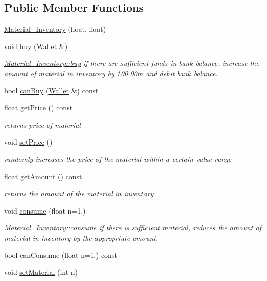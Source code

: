 \subsection*{Public Member Functions}
\begin{DoxyCompactItemize}
\item 
\mbox{\hyperlink{classMaterial__Inventory_a996e5441abe78653a8cb386a499a4063}{Material\+\_\+\+Inventory}} (float, float)
\item 
void \mbox{\hyperlink{classMaterial__Inventory_a5be24d53377c58ea2391e0f872d199d8}{buy}} (\mbox{\hyperlink{classWallet}{Wallet}} \&)
\begin{DoxyCompactList}\small\item\em \mbox{\hyperlink{classMaterial__Inventory_a5be24d53377c58ea2391e0f872d199d8}{Material\+\_\+\+Inventory\+::buy}} if there are sufficient funds in bank balance, increase the amount of material in inventory by 100.\+00m and debit bank balance. \end{DoxyCompactList}\item 
bool \mbox{\hyperlink{classMaterial__Inventory_abb1d889d0af7b79da3b5100a409a5140}{can\+Buy}} (\mbox{\hyperlink{classWallet}{Wallet}} \&) const
\item 
float \mbox{\hyperlink{classMaterial__Inventory_a3e3bf78a963137fdf3be88cecbdcb778}{get\+Price}} () const
\begin{DoxyCompactList}\small\item\em returns price of material \end{DoxyCompactList}\item 
void \mbox{\hyperlink{classMaterial__Inventory_a1ae3a7d9e3d42c8d5bfee551605722ee}{set\+Price}} ()
\begin{DoxyCompactList}\small\item\em randomly increases the price of the material within a certain value range \end{DoxyCompactList}\item 
float \mbox{\hyperlink{classMaterial__Inventory_acc6a2d2b8dc613689561b0165d591fb1}{get\+Amount}} () const
\begin{DoxyCompactList}\small\item\em returns the amount of the material in inventory \end{DoxyCompactList}\item 
void \mbox{\hyperlink{classMaterial__Inventory_a04344339b61a6978d0d669a13b7e034d}{consume}} (float n=1.)
\begin{DoxyCompactList}\small\item\em \mbox{\hyperlink{classMaterial__Inventory_a04344339b61a6978d0d669a13b7e034d}{Material\+\_\+\+Inventory\+::consume}} if there is sufficient material, reduces the amount of material in inventory by the appropriate amount. \end{DoxyCompactList}\item 
bool \mbox{\hyperlink{classMaterial__Inventory_acce12bd627e92d35e9b3ba0272bfa124}{can\+Consume}} (float n=1.) const
\item 
void \mbox{\hyperlink{classMaterial__Inventory_a45faf0563c18ed44ad143440c188a3a5}{set\+Material}} (int n)
\end{DoxyCompactItemize}
